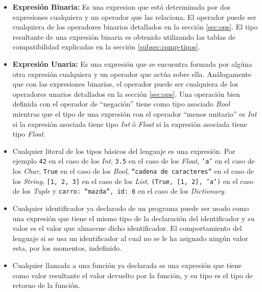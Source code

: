 \documentclass[12pt, spanish]{report}
\begin{document}
\begin{itemize}
\item \textbf{Expresi\'on Binaria:} Es una expresion que est\'a
  determinada por dos expresiones cualquiera y un operador que las
  relaciona. El operador puede ser cualquiera de los operadores
  binarios detallados en la secci\'on \ref{sec:ops}. El tipo
  resultante de una expresi\'on binaria es obtenido utilizando las
  tablas de compatibilidad explicadas en la secci\'on \ref{subsec:comp-tipos}.
      
\item \textbf{Expresi\'on Unaria:} Es una expresi\'on que se encuentra
  formada por alg\'una otra expresi\'on cualquiera y un operador que
  act\'ua sobre ella. An\'alogamente que con las expresiones binarias,
  el operador puede ser cualquiera de los operadores unarios
  detallados en la secci\'on \ref{sec:ops}. Una operaci\'on bien
  definida con el operador de ``negaci\'on'' tiene como tipo asociado
  \emph{Bool} mientras que el tipo de una expresi\'on con el operador
  ``menos unitario'' es \emph{Int} si la expresi\'on asociada tiene tipo
  \emph{Int} \'o \emph{Float} si la expresi\'on asociada tiene tipo
  \emph{Float}.
       
\item Cualquier literal de los tipos b\'asicos del lenguaje es una
  expresi\'on. Por ejemplo \texttt{42} en el caso de los \emph{Int},
  \texttt{3.5} en el caso de los \emph{Float}, \texttt{'a'} en el caso
  de los \emph{Char}, \texttt{True} en el caso de los \emph{Bool},
  \texttt{``cadena de caracteres''} en el caso de los \emph{String},
  \texttt{[1, 2, 3]} en el caso de los \emph{List}, \texttt{(True, [1,
    2], 'a')} en el caso de los \emph{Tuple} y \texttt{{carro:
      ``mazda'', id: 6}} en el caso de los \emph{Dictionary}.
       
\item Cualquier identificador ya declarado de un programa puede ser
  usado como una expresi\'on que tiene el mismo tipo de la
  declaraci\'on del identificador y su valor es el valor que almacene
  dicho identificador. El comportamiento del lenguaje si se usa un
  identificador al cual no se le ha asignado ning\'un valor esta, por
  los momentos, indefinido.
       
\item Cualquier llamada a una funci\'on ya declarada es una
  expresi\'on que tiene como valor resultante el valor devuelto por la
  funci\'on, y su tipo es el tipo de retorno de la funci\'on.
\end{itemize}
\end{document}
